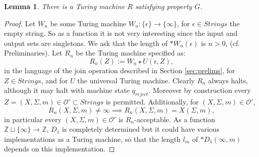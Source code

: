 \documentclass{amsart}  %
\numberwithin{equation}{section}
\newtheorem{lemma}[equation]{Lemma}
\theoremstyle{definition}
\theoremstyle{remark}
\begin{document}
{%
\begin{lemma} \label{lemma:computeWait} There is a Turing machine
$R$
satisfying property $G$. 
\end{lemma}
\begin{proof}
 Let $W _{n} $ be some Turing machine $W _{n} : \{\epsilon\} \to \{\infty\}$, for $\epsilon \in Strings$ the empty string. So as a function it is not very interesting since the input and output sets are singletons. We ask that the length of $*W _{n}  (\epsilon)$ is $n>0$, (cf. Preliminaries).  
Let $R _{n} $ be the Turing machine specified as:
  \begin{equation*}
   R _{n}  (Z):=   W _{n}   \star U (\epsilon, Z),
\end{equation*}
   in the language of the join operation described in Section \ref{sec:prelims}, for $Z \in Strings$, and for $U$ the universal Turing machine. Clearly $R _{n} $ always halts,  although it may halt with machine state $q _{reject} $. Moreover by construction every $Z = (X, \Sigma,m) \in \mathcal{O}' \subset Strings$ is permitted.
Additionally, for $ (X, \Sigma,m) \in \mathcal{O}'$, $$R _{n}  (X, \Sigma,m) \neq \infty \implies R _{n}  (X,\Sigma,m ) = X (\Sigma,m), $$ in particular every $(X,\Sigma, m) \in \mathcal{O}'$ is $R _{n} $-acceptable.  As a function $\mathbb{Z} \sqcup \{\infty\}   \to \mathbb{Z}$, $D _{1} $ is completely determined but it could have various implementations as a Turing machine,  so that the length $l _{m}  $  of $*D _{1} (\infty,m) $ depends on this implementation.

\end{proof}}
\end{document}
